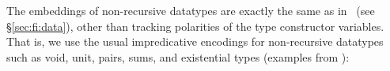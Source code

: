 The embeddings of non-recursive datatypes are exactly the same as in \Fi\ (see
\S\ref{sec:fi:data}), other than tracking polarities of the type constructor
variables. That is, we use the usual impredicative encodings for non-recursive
datatypes such as void, unit, pairs, sums, and existential types
(examples from \citet{AbeMat04}):

